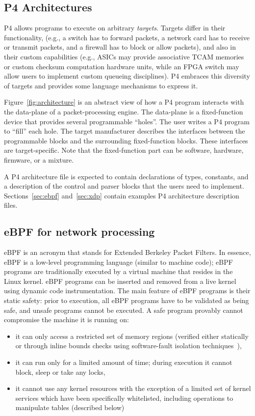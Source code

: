 \subsection{P4 Architectures}

P4 allows programs to execute on arbitrary \emph{targets}.  Targets
differ in their functionality, (e.g., a switch has to forward packets,
a network card has to receive or transmit packets, and a firewall has
to block or allow packets), and also in their custom capabilities
(e.g., ASICs may provide associative TCAM memories or custom checksum
computation hardware units, while an FPGA switch may allow users to
implement custom queueing disciplines).  P4 embraces this diversity of
targets and provides some language mechanisms to express it.


Figure~\ref{fig:architecture} is an abstract view of how a P4 program
interacts with the data-plane of a packet-processing engine.  The
data-plane is a fixed-function device that provides several
programmable ``holes''.  The user writes a P4 program to ``fill'' each
hole.  The target manufacturer describes the interfaces between the
programmable blocks and the surrounding fixed-function blocks.  These
interfaces are target-specific.  Note that the fixed-function part can
be software, hardware, firmware, or a mixture.

A P4 architecture file is expected to contain declarations of types,
constants, and a description of the control and parser blocks that the
users need to implement.  Sections~\ref{sec:ebpf} and~\ref{sec:xdp}
contain examples P4 architecture description files.

\subsection{eBPF for network processing}

eBPF is an acronym that stands for Extended Berkeley Packet Filters. In essence,
eBPF is a low-level programming language (similar to machine code);
eBPF programs are traditionally executed by a virtual machine that
resides in the Linux kernel. eBPF programs can be inserted and removed
from a live kernel using dynamic code instrumentation. The main
feature of eBPF programs is their static safety: prior to execution,
all eBPF programs have to be validated as being safe, and unsafe
programs cannot be executed. A safe program provably cannot compromise
the machine it is running on:
\begin{itemize}
\item it can only access a restricted set of memory regions (verified
  either statically or through inline bounds checks using
  software-fault isolation techniques~\cite{wahbe:93}),
\item it can run only for a limited amount of time; during execution
  it cannot block, sleep or take any locks,
\item it cannot use any kernel resources with the exception of a
  limited set of kernel services which have been specifically
  whitelisted, including operations to manipulate tables (described
  below)
\end{itemize}

